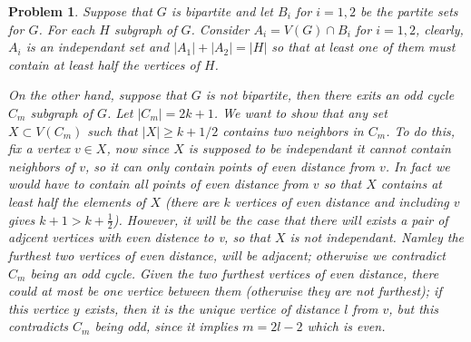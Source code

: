 \documentclass{article}
\newtheorem{prb}{Problem}
\begin{document}
\begin{prb}
Suppose that $G$ is bipartite and let $B_i$ for $i = 1,2$ be the partite sets for $G$. For each $H$ subgraph of $G$. 
Consider $A_i = V(G) \cap B_i$ for $i = 1, 2$, clearly, $A_i$ is an independant set and $|A_1| + |A_2| = |H|$ so that at least 
one of them must contain at least half the vertices of $H$. 

On the other hand, suppose that $G$ is not bipartite, then there exits an odd cycle $C_m$ subgraph of $G$. 
Let $|C_m| = 2k+1$. We want to show that any set $X \subset V(C_m)$ such that 
$|X| \geq k + 1/2$ contains two neighbors in $C_m$. 
To do this, fix a vertex $v \in X$, now since $X$ is supposed to be independant it cannot contain neighbors of $v$, so it 
can only contain points of even distance from $v$. In fact we would have to contain all points of even distance from $v$ so that $X$ contains at least 
half the elements of $X$ (there are $k$ vertices of even distance and including $v$ gives $k+1 > k + \frac{1}{2}$). However, 
it will be the case that there will exists a pair of adjcent vertices with even distence to v, so that $X$ is not independant. Namley the furthest two vertices of even distance, will be adjacent; otherwise we contradict $C_m$ being an odd cycle. Given the two furthest vertices of even distance, there could 
at most be one vertice between them (otherwise they are not furthest); if this vertice $y$ exists, then it is the unique vertice of distance $l$ from 
$v$, but this contradicts $C_m$ being odd, since it implies $m = 2l - 2$ which is even. 

\end{prb}
\end{document}
